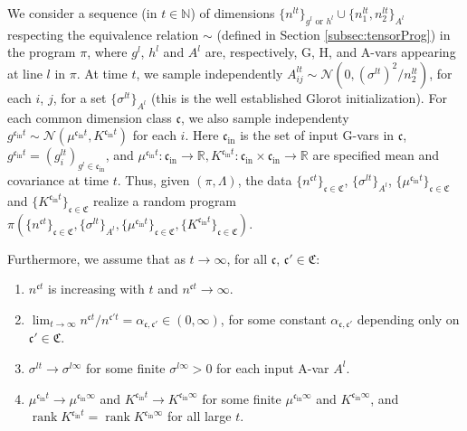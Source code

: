 \documentclass[11pt,notitlepage]{article}
\numberwithin{equation}{section}
\def\R{{\mathbb{R}}}
\def\normdist{\mathcal{N}}
\DeclareMathOperator{\rank}{rank}
\theoremstyle{remark}
\theoremstyle{definition}
\begin{document}
	We consider a sequence (in $t \in \mathbb{N}$) of dimensions $\{n^{lt}\}_{g^l \text{ or } h^l} \cup \{n_1^{lt}, n_2^{lt}\}_{A^l}$ respecting the equivalence relation $\sim$ (defined in Section \ref{subsec:tensorProg}) in the program $\pi$, where $g^l$, $h^l$ and $A^l$ are, respectively, G, H, and A-vars appearing at line $l$ in $\pi$.
	At time $t$, we sample independently $A^{lt}_{ij} \sim \normdist(0, (\sigma^{lt})^2/n_2^{lt})$, for each $i$, $j$, for a set $\{\sigma^{lt} \}_{A^l}$ (this is the well established Glorot initialization).
	For each common dimension class $\mathfrak{c}$, we also sample independenty $g^{\mathfrak{c}_{\text{in}}t} \sim \normdist(\mu^{\mathfrak{c}_{\text{in}}t}, K^{\mathfrak{c}_{\text{in}}t})$ for each $i$.
	Here $\mathfrak{c}_{\text{in}}$ is the set of input G-vars in $\mathfrak{c}$, $g^{\mathfrak{c}_{\text{in}}t} = (g^{lt}_i)_{g^l \in \mathfrak{c}_{\text{in}}}$, and $\mu^{\mathfrak{c}_{\text{in}}t}: \mathfrak{c}_{\text{in}} \rightarrow \R, K^{\mathfrak{c}_{\text{in}}t}: \mathfrak{c}_{\text{in}} \times \mathfrak{c}_{\text{in}} \rightarrow \R$ are specified mean and covariance at time $t$.
	Thus, given $(\pi, \Lambda)$, the data $\{n^{\mathfrak{c}t}\}_{\mathfrak{c} \in \mathfrak{C}}$, $\{\sigma^{lt}\}_{A^l}$, $\{\mu^{\mathfrak{c}_{\text{in}}t}\}_{\mathfrak{c} \in \mathfrak{C}}$ and $\{K^{\mathfrak{c}_{\text{in}}t}\}_{\mathfrak{c} \in \mathfrak{C}}$ realize a random program $\pi(\{n^{\mathfrak{c}t}\}_{\mathfrak{c} \in \mathfrak{C}}, \{\sigma^{lt}\}_{A^l}, \{\mu^{\mathfrak{c}_{\text{in}}t}\}_{\mathfrak{c} \in \mathfrak{C}}, \{K^{\mathfrak{c}_{\text{in}}t}\}_{\mathfrak{c} \in \mathfrak{C}})$.
	
	Furthermore, we assume that as $t \rightarrow \infty$, for all $\mathfrak{c}$, $\mathfrak{c}' \in \mathfrak{C}$:
	\begin{enumerate}[itemsep=0em, topsep=3pt]
		\item $n^{\mathfrak{c}t}$ is increasing with $t$ and $n^{\mathfrak{c}t} \rightarrow \infty$.
		\item $\lim_{t \rightarrow \infty} n^{\mathfrak{c}t} / n^{\mathfrak{c}'t} = \alpha_{\mathfrak{c}, \mathfrak{c}'} \in (0, \infty)$, for some constant $\alpha_{\mathfrak{c}, \mathfrak{c}'}$ depending only on $\mathfrak{c}' \in \mathfrak{C}$.
		\item $\sigma^{lt} \rightarrow \sigma^{l\infty}$ for some finite $\sigma^{l\infty} > 0$ for each input A-var $A^l$.
		\item $\mu^{\mathfrak{c}_{\text{in}}t} \rightarrow \mu^{\mathfrak{c}_{\text{in}}\infty}$ and $K^{\mathfrak{c}_{\text{in}}t} \rightarrow K^{\mathfrak{c}_{\text{in}}\infty}$ for some finite $\mu^{\mathfrak{c}_{\text{in}}\infty}$ and $K^{\mathfrak{c}_{\text{in}}\infty}$, and $\rank K^{\mathfrak{c}_{\text{in}}t} = \rank K^{\mathfrak{c}_{\text{in}}\infty}$ for all large $t$.
	\end{enumerate}
	
\end{document}
